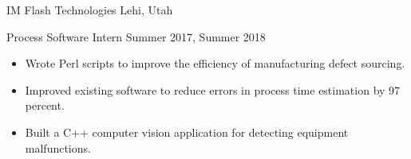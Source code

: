 \blockskip

\begin{tab1} IM Flash Technologies \> Lehi, Utah \end{tab1}
\begin{tab2} Process Software Intern \> Summer 2017, Summer 2018 \end{tab2}
\begin{itemize}
    \item Wrote Perl scripts to improve the efficiency of manufacturing defect sourcing.
    \item Improved existing software to reduce errors in process time estimation by 97 percent.
    \item Built a C++ computer vision application for detecting equipment malfunctions.
\end{itemize}


